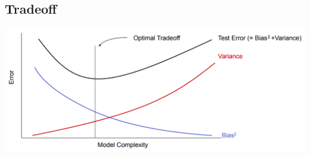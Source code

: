 \documentclass[8pt, a4paper, landscape, includeheadfoot]{extarticle}
\begin{document}
\begin{multicols*}{4}
	\subsection{Tradeoff}

	\begin{center}
		\includegraphics[width = 0.8\linewidth]{0_images/bias_variance_tradeoff.png}
	\end{center}

\end{multicols*}
\end{document}
